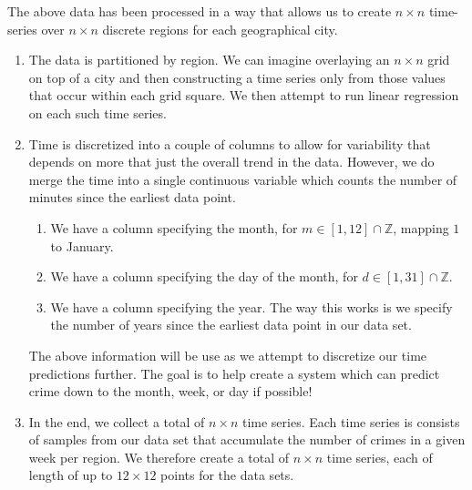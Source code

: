 \documentclass[11pt]{article}
\begin{document}
The above data has been processed in a way that allows us to create $n\times n$ time-series over $n \times n$ discrete regions for each geographical city. 
\begin{enumerate}
\item The data is partitioned by region. We can imagine overlaying an $n \times n$ grid on top of a city and then constructing a time series only from those values that occur within each grid square. We then attempt to run linear regression on each such time series. 
\item Time is discretized into a couple of columns to allow for variability that depends on more that just the overall trend in the data. However, we do merge the time into a single continuous variable which counts the number of minutes since the earliest data point. 
\begin{enumerate}
\item We have a column specifying the month, for $m \in [1,12] \cap \mathbb{Z}$, mapping $1$ to January. 
\item We have a column specifying the day of the month, for $d \in [1,31] \cap \mathbb{Z}$.
\item We have a column specifying the year. The way this works is we specify the number of years since the earliest data point in our data set.
\end{enumerate}
The above information will be use as we attempt to discretize our time predictions further. The goal is to help create a system which can predict crime down to the month, week, or day if possible!
\item In the end, we collect a total of $n \times n$ time series. Each time series is consists of samples from our data set that accumulate the number of crimes in a given week per region. We therefore create a total of $n \times n$ time series, each of length of up to $12 \times 12$ points for the data sets.
\end{enumerate}
\end{document}
